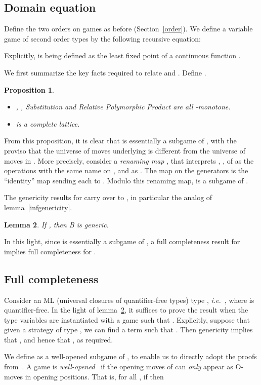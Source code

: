 \documentclass[a4paper,11pt]{article}
\newtheorem{proposition}{Proposition}[section]
\newtheorem{lemma}[proposition]{Lemma}
\newcommand{\ie}{\textit{i.e.}\ }
\begin{document}
\subsection{Domain equation}
Define the two orders  on games as before
(Section~\ref{order}).   We define a variable game  of second order types by the following recursive
equation:

Explicitly,  is being defined as
the least fixed point of a continuous function .

We first summarize the key facts required to relate  and
.  Define .
\begin{proposition} \hfill
\begin{itemize}
\item  , , Substitution and Relative Polymorphic
Product are all -monotone.
\item  is a complete lattice.
\end{itemize}
\end{proposition}
From this proposition, it is clear that  is essentially a
subgame of , with the proviso that the universe of moves
underlying  is different from the universe of moves in
.  More precisely, consider a \emph{renaming map} , that interprets , ,  of
 as the operations with the same name on , and
 as . The map on the
generators is the ``identity'' map sending each  to . Modulo this renaming map,  is a subgame of
.

The genericity results for  carry over to , in
particular the analog of lemma~\ref{infgenericity}.
\begin{lemma}\label{LUUgenericity} If
, then B is generic.
\end{lemma}
In this light, since  is essentially a subgame of , a
full completeness result for  implies full completeness for
.

\subsection{Full completeness}


Consider an ML (universal closures of quantifier-free types) type
, \ie , where  is quantifier-free.  
In the light of lemma~\ref{LUUgenericity}, it suffices to
prove the result when the type variables are instantiated with a
game  such that . Explicitly, suppose that given a strategy  of
type , we can find a term  such that . Then genericity implies that , and hence that , as required.

We define  as a well-opened subgame of , to enable us
to directly adopt the proofs from~\cite{AJM00}.  A game  is
{\em well-opened}~\cite{AJM00} if the opening moves of  can
\emph{only} appear as O-moves in opening positions. That is, for all 
, if
 then
\end{document}
